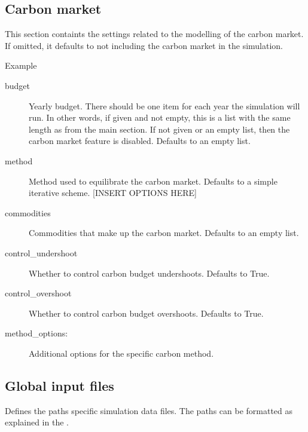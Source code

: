 \documentclass[letterpaper,10pt,english]{sphinxmanual}
\begin{document}
\subsection{Carbon market}
\label{\detokenize{inputs/toml:carbon-market}}
This section containts the settings related to the modelling of the carbon market. If omitted, it defaults to not
including the carbon market in the simulation.

Example

\begin{sphinxVerbatim}[commandchars=\\\{\}]
  
\end{sphinxVerbatim}
\begin{description}
\item[{budget}] \leavevmode
Yearly budget. There should be one item for each year the simulation will run. In
other words, if given and not empty, this is a list with the same length as
 from the main section. If not given or an empty list, then the
carbon market feature is disabled. Defaults to an empty list.

\item[{method}] \leavevmode
Method used to equilibrate the carbon market. Defaults to a simple iterative scheme. {[}INSERT OPTIONS HERE{]}

\item[{commodities}] \leavevmode
Commodities that make up the carbon market. Defaults to an empty list.

\item[{control\_undershoot}] \leavevmode
Whether to control carbon budget undershoots. Defaults to True.

\item[{control\_overshoot}] \leavevmode
Whether to control carbon budget overshoots. Defaults to True.

\item[{method\_options:}] \leavevmode
Additional options for the specific carbon method.

\end{description}


\subsection{Global input files}
\label{\detokenize{inputs/toml:global-input-files}}
Defines the paths specific simulation data files. The paths can be formatted as
explained in the {\hyperref[\detokenize{inputs/toml_primer:toml-primer}]{}}.
\end{document}
